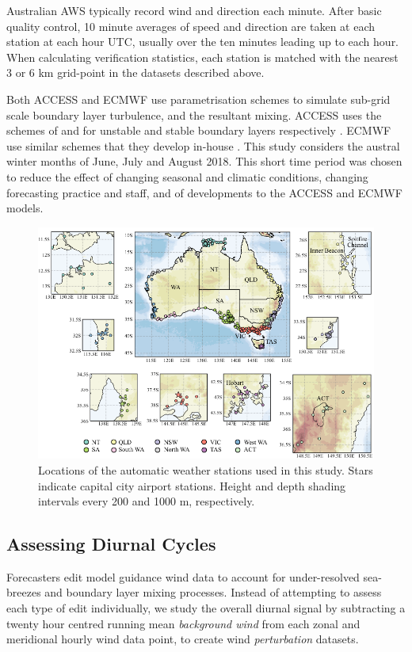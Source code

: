 \documentclass[twocol]{ametsoc}
\begin{document}
Australian AWS typically record wind and direction each minute. After basic quality control, 10 minute averages of speed and direction are taken at each station at each hour UTC, usually over the ten minutes leading up to each hour. When calculating verification statistics, each station is matched with the nearest 3 or 6 km grid-point in the datasets described above.         
 
Both ACCESS and ECMWF use parametrisation schemes to simulate sub-grid scale boundary layer turbulence, and the resultant mixing. ACCESS uses the schemes of \citet{lock00} and \citet{louis79} for unstable and stable boundary layers respectively \citep{bom10}. ECMWF use similar schemes that they develop in-house \citep{ecmwf19a}. This study considers the austral winter months of June, July and August 2018. This short time period was chosen to reduce the effect of changing seasonal and climatic conditions, changing forecasting practice and staff, and of developments to the ACCESS and ECMWF models.

\begin{figure}
\centering
\includegraphics[width=39pc]{map.pdf}
\caption{Locations of the automatic weather stations used in this study. Stars indicate capital city airport stations. Height and depth shading intervals every 200 and 1000 m, respectively.}
\label{Fig:map}
\end{figure}

\subsection{Assessing Diurnal Cycles}
Forecasters edit model guidance wind data to account for under-resolved sea-breezes and boundary layer mixing processes. Instead of attempting to assess each type of edit individually, we study the overall diurnal signal by subtracting a twenty hour centred running mean \textit{background wind} from each zonal and meridional hourly wind data point, to create wind \emph{perturbation} datasets. 
\end{document}
